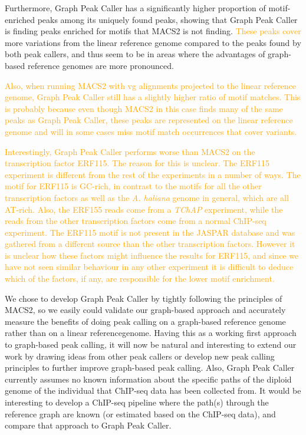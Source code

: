\documentclass[10pt,letterpaper]{article}
\newcommand{\revision}[1]{\textcolor{orange}{#1}}
\begin{document}
Furthermore, Graph Peak Caller has a significantly higher proportion of motif-enriched peaks among its uniquely found peaks, showing that Graph Peak Caller is finding peaks enriched for motifs that MACS2 is not finding.
\revision{These peaks cover} more variations from the linear reference genome compared to the peaks found by both peak callers, and thus seem to be in areas where the advantages of graph-based reference genomes are more pronounced. 

\revision{Also, when running MACS2 with vg alignments projected to the linear reference genome, Graph Peak Caller still has a slightly higher ratio of motif matches. This is probably because even though MACS2 in this case finds many of the same peaks as Graph Peak Caller, these peaks are represented on the linear reference genome and will in some cases miss motif match occurrences that cover variants.}

\revision{Interestingly, Graph Peak Caller performs worse than MACS2 on the transcription factor ERF115. The reason for this is unclear. The ERF115 experiment is different from the rest of the experiments in a number of ways. The motif for ERF115 is GC-rich, in contrast to the motifs for all the other transcription factors as well as the \emph{A. haliana} genome in general, which are all AT-rich. Also, the ERF155 reads come from a \emph{TChAP} experiment, while the reads from the other transcription factors come from a normal ChIP-seq experiment. The ERF115 motif is not present in the JASPAR database and was gathered from a different source than the other transcription factors. However it is unclear how these factors might influence the results for ERF115, and since we have not seen similar behaviour in any other experiment it is difficult to deduce which of the factors, if any, are responsible for the lower motif enrichment.}

We chose to develop Graph Peak Caller by tightly following the principles of MACS2, so we easily could validate our graph-based approach and accurately measure the benefits of doing peak calling on a graph-based reference genome rather than on a linear referencegenome. Having this as a working first approach to graph-based peak calling, it will now be natural and interesting  to extend our work by drawing ideas from other peak callers or develop new peak calling principles to further improve graph-based peak calling. Also, Graph Peak Caller currently assumes no known information about the specific paths of the diploid genome of the individual that ChIP-seq data has been collected from. It would be interesting to develop a ChIP-seq pipeline where the path(s) through the reference graph are known (or estimated based on the ChIP-seq data), and compare that approach to Graph Peak Caller.
\end{document}

